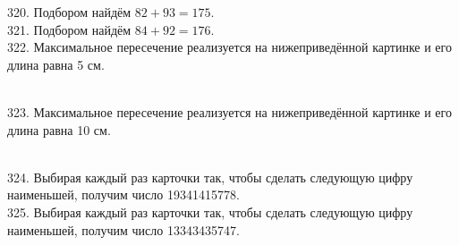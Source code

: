\documentclass[12pt]{article}
\begin{document}
320. Подбором найдём $82+93=175.$\\
321. Подбором найдём $84+92=176.$\\
322. Максимальное пересечение реализуется на нижеприведённой картинке и его длина равна 5 см.\\
\begin{figure}[ht!]
\end{figure}\\
323. Максимальное пересечение реализуется на нижеприведённой картинке и его длина равна 10 см.\\
\begin{figure}[ht!]
\end{figure}\\
324. Выбирая каждый раз карточки так, чтобы сделать следующую цифру наименьшей, получим число 19341415778.\\
325. Выбирая каждый раз карточки так, чтобы сделать следующую цифру наименьшей, получим число 13343435747.\\
\end{document}
